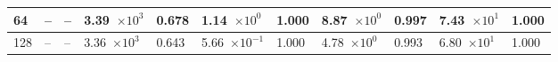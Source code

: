 \begin{table}[!t]
\begin{center}
\begin{small}
\begin{sc}
\begin{tabular}{|l|p{1.2cm}|p{0.8cm}|p{1.2cm}|p{0.8cm}|p{1.2cm}|p{0.8cm}|p{1.2cm}|p{0.8cm}|p{1.2cm}|p{0.8cm}|}
                    \hline
                    64  & --                  & --    & 3.39~$\times10^{3}$ & 0.678 & 1.14~$\times10^{0}$  & 1.000 & 8.87~$\times10^{0}$ & 0.997  & 7.43~$\times10^{1}$ & 1.000 \\
                    \hline
                    128 & --                  & --    & 3.36~$\times10^{3}$ & 0.643 & 5.66~$\times10^{-1}$ & 1.000 & 4.78~$\times10^{0}$ & 0.993  & 6.80~$\times10^{1}$ & 1.000 \\
                    \hline
                \end{tabular}
            \end{sc}
        \end{small}
    \end{center}
    \vskip -0.1in
\end{table}


